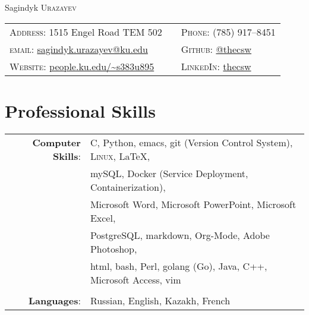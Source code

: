 \documentclass[a4paper,10pt]{article}
\begin{document}
\pagestyle{empty} %

\par{\centering
		{\Huge Sagindyk \textsc{Urazayev}
	}\bigskip\par}

      \begin{center}
        \begin{tabular}{lcl}
          \textsc{Address:}   1515 Engel Road TEM 502 &&
                                                         \textsc{Phone:}      (785) 917--8451\\
          \textsc{email:}      \href{mailto:sagindyk.urazayev@ku.edu}{sagindyk.urazayev@ku.edu}&&
                                                                                                  \textsc{Github:} \href{https://github.com/thecsw}{@thecsw}\\
          \textsc{Website:} \href{http://people.ku.edu/~s383u895}{people.ku.edu/\textasciitilde{}s383u895} && \textsc{LinkedIn:} \href{https://linkedin.com/in/thecsw}{thecsw}\\
        \end{tabular}
      \end{center}
      
\section{Professional Skills}
\begin{tabular}{rl}

  \textbf{Computer Skills}:& C, Python, emacs, git (Version Control System), \textsc{Linux}, \LaTeX, \\& mySQL,
  Docker (Service Deployment, Containerization),\\& Microsoft Word, Microsoft PowerPoint, Microsoft Excel,\\&
  PostgreSQL, markdown, Org-Mode, Adobe Photoshop, \\& html, bash, Perl, golang (Go), Java, C++, Microsoft Access, vim\\\\

  \textbf{Languages}: &Russian, English, Kazakh, French\\
  
\end{tabular}
\end{document}
